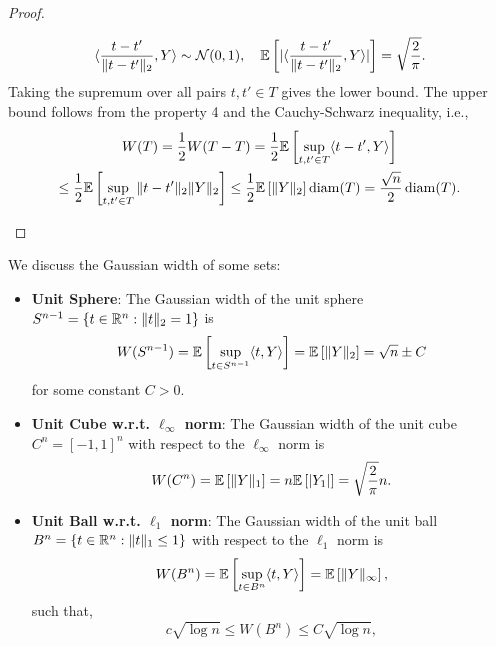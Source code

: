 \begin{proof}
\begin{enumerate}
\begin{equation*}
                \langle \frac{t-t'}{\|t-t'\|_{2}},Y\rangle\sim{\mathcal N}(0,1),\quad {\mathbb E}\left[|\langle \frac{t-t'}{\|t-t'\|_{2}},Y\rangle|\right]=\sqrt{\frac{2}{\pi}}.
            \end{equation*}
            Taking the supremum over all pairs \(t,t'\in T\) gives the lower bound. The upper bound follows from the property 4 and the Cauchy-Schwarz inequality, i.e.,
            \begin{multline*}
                    W(T)=\frac{1}{2}W(T-T)=\frac{1}{2}{\mathbb E}\left[\sup_{t,t'\in T}\langle t-t',Y\rangle\right]\\
                    \leq\frac{1}{2}{\mathbb E}\left[\sup_{t,t'\in T}\|t-t'\|_{2}\|Y\|_{2}\right]\leq\frac{1}{2}{\mathbb E}\left[\|Y\|_{2}\right]\operatorname{diam}(T)=\frac{\sqrt{n}}{2}\operatorname{diam}(T).
            \end{multline*}
    \end{enumerate}
\end{proof}

\begin{example}
    We discuss the Gaussian width of some sets:
    \begin{itemize}
        \item \textbf{Unit Sphere}: The Gaussian width of the unit sphere \(S^{n-1}=\{t\in{\mathbb R}^{n}:\|t\|_{2}=1\}\) is
            \begin{equation*}
                W(S^{n-1})={\mathbb E}\left[\sup_{t\in S^{n-1}}\langle t,Y\rangle\right]={\mathbb E}\left[\|Y\|_{2}\right]=\sqrt{n}\pm C
            \end{equation*}
            for some constant \(C>0\).
        \item \textbf{Unit Cube w.r.t. \(\ell_{\infty}\) norm}: The Gaussian width of the unit cube \(C^{n}=[-1,1]^{n}\) with respect to the \(\ell_{\infty}\) norm is
            \begin{equation*}
                W(C^{n})={\mathbb E}\left[\|Y\|_{1}\right]=n{\mathbb E}\left[|Y_{1}|\right]=\sqrt{\frac{2}{\pi}}n.
            \end{equation*}
        \item \textbf{Unit Ball w.r.t. \(\ell_{1}\) norm}: The Gaussian width of the unit ball \(B^{n}=\{t\in{\mathbb R}^{n}:\|t\|_{1}\leq 1\}\) with respect to the \(\ell_{1}\) norm is
            \begin{equation*}
                W(B^{n})={\mathbb E}\left[\sup_{t\in B^{n}}\langle t,Y\rangle\right]={\mathbb E}\left[\|Y\|_{\infty}\right],
            \end{equation*}
            such that,
            \begin{equation*}
                c\sqrt{\log n}\leq W(B^{n})\leq C\sqrt{\log n},
            \end{equation*}
    \end{itemize}
\end{example}


